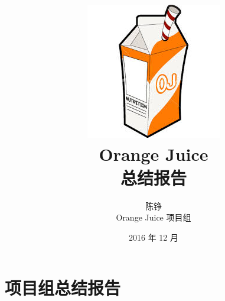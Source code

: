\documentclass{ctexbook}
\title{\includegraphics[]{logo.png}\\ Orange Juice \\ 总结报告}
\author{陈铮 \\ Orange Juice 项目组}
\date{2016 年 12 月}
\begin{document}
\maketitle

\tableofcontents

\part{项目组总结报告}





\end{document}
